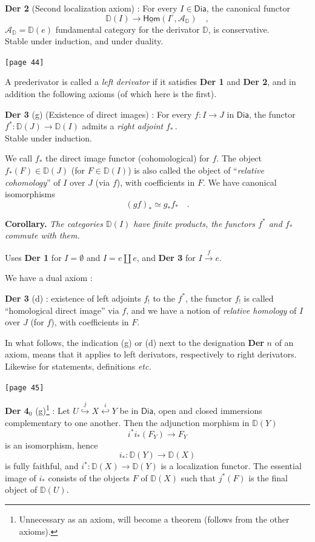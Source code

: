\documentclass[11pt]{article}
\newcommand{\printedpage}[1]{\marginpar{\footnotesize p.~#1}}
\newcommand{\msp}[1]{\marginpar{\footnotesize [#1]}}
\newcommand{\D}{\mathbb{D}}
\newcommand{\Dia}{\mathsf{Dia}}
\begin{document}
\printedpage{24}

\noindent\textbf{Der 2} (Second localization axiom) : For every $I \in \Dia$, the canonical functor
\[ \D(I) \longrightarrow \underline{\mathsf{Hom}}(I^{\circ}, \mathcal{A}_{\D}) \quad , \]
$\mathcal{A}_{\D} = \D(e)$ fundamental category for the derivator $\D$, is conservative.\\
Stable under induction, and under duality.

\noindent\msp{page 44}\texttt{[page 44]}

\noindent A prederivator is called a \textit{left derivator} if it satisfies \textbf{Der 1} and \textbf{Der 2}, and in addition the following axioms (of which here is the first).

\noindent\textbf{Der 3} (g) (Existence of direct images) : For every $f : I \to J$ in $\Dia$, the functor $f^{*} : \D(J) \to \D(I)$ admits a \textit{right adjoint} $f_{*}$\,.\\
Stable under induction.

We call $f_{*}$ the direct image functor (cohomological) for $f$. The object $f_{*}(F) \in \D(J)$ (for $F \in \D(I)$) is also called the object of ``\textit{relative cohomology}'' of $I$ over $J$ (via $f$), with coefficients in $F$. We have canonical isomorphisms
\[ (gf)_{*} \simeq g_{*} f_{*} \quad . \]

\noindent\textbf{Corollary.} \textit{The categories $\D(I)$ have finite products, the functors $f^{*}$ and $f_{*}$ commute with them.}

Uses \textbf{Der 1} for $I = \emptyset$ and $I = e \amalg e$, and \textbf{Der 3} for $I \xrightarrow{f} e$.

We have a dual axiom :

\noindent\textbf{Der 3} (d) : existence of left adjoints $f_{!}$ to the $f^{*}$, the functor $f_{!}$ is called ``homological direct image'' via $f$, and we have a notion of \textit{relative homology} of $I$ over $J$ (for $f$), with coefficients in $F$.

In what follows, the indication (g) or (d) next to the designation \textbf{Der} $n$ of an axiom, %
means that it applies to left derivators, respectively to right derivators. Likewise for statements, definitions \textit{etc.}

\noindent\msp{page 45}\texttt{[page 45]}

\noindent\textbf{Der 4}$_{0}$ (g)\footnote[13]{Unnecessary as an axiom, will become a theorem (follows from the other axioms).} : Let $U \overset{j}{\hookrightarrow} X \overset{i}{\hookleftarrow} Y$ be in $\Dia$, open and closed immersions complementary to one another. Then the adjunction morphism in $\D(Y)$
\[ i^{*} i_{*}(F_{Y}) \longrightarrow F_{Y} \]
is an isomorphism, hence
\[ i_{*} : \D(Y) \longrightarrow \D(X) \]
is fully faithful, and $i^{*} : \D(X) \to \D(Y)$ is a localization functor. The essential image of $i_{*}$ consists of the objects $F$ of $\D(X)$ such that $j^{*}(F)$ is the final object of $\D(U)$.
\end{document}
